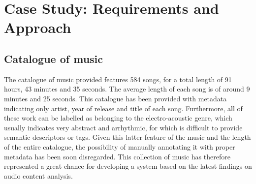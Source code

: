 \chapter{Case Study: Requirements and Approach} %

\label{Chapter4} %


\section{Catalogue of music}
\label{sec:catalogue}
The catalogue of music provided features 584 songs, for a total length of 91 hours, 43 minutes and 35 seconds. The average length of each song is of around 9 minutes and 25 seconds. This catalogue has been provided with metadata indicating only artist, year of release and title of each song. Furthermore, all of these work can be labelled as belonging to the electro-acoustic genre, which usually indicates very abstract and arrhythmic, for which is difficult to provide semantic descriptors or tags. Given this latter feature of the music and the length of the entire catalogue, the possibility of manually annotating it with proper metadata has been soon disregarded. This collection of music has therefore represented a great chance for developing a system based on the latest findings on audio content analysis.

